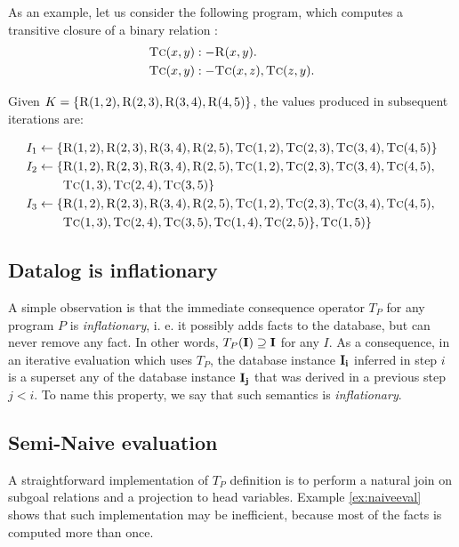 \begin{exmp}
As an example, let us consider the following program, which computes a transitive closure of a binary relation :
\begin{align}
\textsc{Tc}(x, y) &:- \textsc{R}(x, y).\\
\textsc{Tc}(x, y) &:- \textsc{Tc}(x, z), \textsc{Tc}(z, y).
\end{align}

Given $K = \{\textsc{R}(1, 2), \textsc{R}(2, 3), \textsc{R}(3, 4), \textsc{R}(4, 5)\}$, the values produced in subsequent iterations are:

\begin{align*}
I_1 \leftarrow \{&\textsc{R}(1, 2), \textsc{R}(2, 3), \textsc{R}(3, 4), \textsc{R}(2, 5), \textsc{Tc}(1, 2), \textsc{Tc}(2, 3), \textsc{Tc}(3, 4), \textsc{Tc}(4, 5)\}\\
I_2 \leftarrow \{&\textsc{R}(1, 2), \textsc{R}(2, 3), \textsc{R}(3, 4), \textsc{R}(2, 5), \textsc{Tc}(1, 2), \textsc{Tc}(2, 3), \textsc{Tc}(3, 4), \textsc{Tc}(4, 5), \\
&\textsc{Tc}(1, 3), \textsc{Tc}(2, 4), \textsc{Tc}(3, 5)\}\\
I_3 \leftarrow \{&\textsc{R}(1, 2), \textsc{R}(2, 3), \textsc{R}(3, 4), \textsc{R}(2, 5), \textsc{Tc}(1, 2), \textsc{Tc}(2, 3), \textsc{Tc}(3, 4), \textsc{Tc}(4, 5),\\
& \textsc{Tc}(1, 3), \textsc{Tc}(2, 4), \textsc{Tc}(3, 5), \textsc{Tc}(1, 4), \textsc{Tc}(2, 5)\}, \textsc{Tc}(1, 5)\}\\
\end{align*}
\end{exmp}\label{ex:naiveeval}

\subsection{Datalog is inflationary}

A simple observation is that the immediate consequence operator $T_P$ for any program $P$ is \emph{inflationary}, i. e. it possibly adds facts to the database, but can never remove any fact. In other words, $T_P(\bf{I}) \supseteq \bf{I}$ for any $I$. As a consequence, in an iterative evaluation which uses $T_P$, the database instance $\bf{I}_i$ inferred in step $i$ is a superset any of the database instance $\bf{I}_j$ that was derived in a previous step $j < i$. To name this property, we say that such semantics is \emph{inflationary}.

\subsection{Semi-Naive evaluation}\label{ss:seminaiveevaldatalog}
A straightforward implementation of $T_P$ definition is to perform a natural join on subgoal relations and a projection to head variables. Example \ref{ex:naiveeval} shows that such implementation may be inefficient, because most of the facts is computed more than once.

